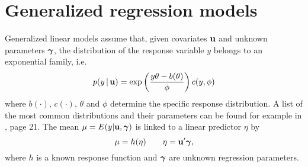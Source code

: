 \documentclass[11pt,a4paper,twoside]{bayesxarticle}
\begin{document}
\section{Generalized regression models}
\label{obsmodel}

Generalized linear models assume that, given covariates $\mathbf{u}$ and
unknown parameters $\boldsymbol{\gamma}$, the distribution of the response
variable $y$ belongs to an exponential family, i.e.
\begin{equation}
\label{likel} p(y \, | \, \uvec) = \exp \left( \frac{y \theta -
b(\theta)}{\phi} \right) c(y,\phi)
\end{equation}
where $b(\cdot)$, $c(\cdot)$, $\theta$ and $\phi$ determine the specific response distribution. A list of the most common
distributions and their parameters can be found for example in , page 21. The mean
$\mu=E(y|\mathbf{u},\boldsymbol{\gamma})$ is linked to a linear predictor $\eta$ by
\begin{equation}
\label{glm} \mu=h(\eta) \qquad \eta= \uvec'\gammavec,
\end{equation}
where $h$ is a known response function and $\boldsymbol{\gamma}$ are unknown
regression parameters.
\end{document}
